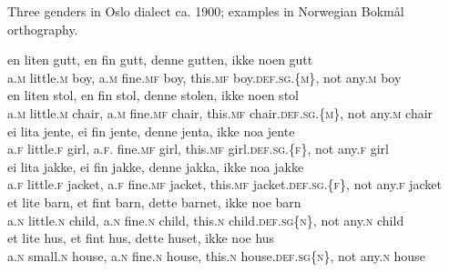 \documentclass[output=paper]{langsci/langscibook}
\begin{document}
\begin{exe}

\ex\label{ex:Enger:1} Three genders in Oslo dialect ca. 1900; examples in Norwegian Bokmål orthography.

\begin{xlist}
\ex\label{ex:Enger:1a}
\gll en liten gutt, en fin gutt, denne gutten, ikke noen gutt \\
a.\textsc{m} little.\textsc{m} boy, a.\textsc{m} fine.\textsc{mf} boy, this.\textsc{mf} boy.\textsc{def}.\textsc{sg}.\textsc{\{m\}}, not any.\textsc{m} boy \\

\ex\label{ex:Enger:1b}
\gll en liten stol, en fin stol, denne stolen, ikke noen stol \\
a.\textsc{m} little.\textsc{m} chair, a.\textsc{m} fine.\textsc{mf} chair, this.\textsc{mf} chair.\textsc{def}.\textsc{sg}.\textsc{\{m\}}, not any.\textsc{m} chair\\

\ex\label{ex:Enger:1c}
\gll ei lita jente, ei fin jente, denne jenta, ikke noa jente \\
a.\textsc{f} little.\textsc{f} girl, a.\textsc{f}. fine.\textsc{mf} girl, this.\textsc{mf} girl.\textsc{def}.\textsc{sg}.\textsc{\{f\}}, not any.\textsc{f} girl\\

\ex\label{ex:Enger:1d}
\gll ei lita jakke, ei fin jakke, denne jakka, ikke noa jakke \\
a.\textsc{f} little.\textsc{f} jacket, a.\textsc{f} fine.\textsc{mf} jacket, this.\textsc{mf} jacket.\textsc{def}.\textsc{sg}.\textsc{\{f\}}, not any.\textsc{f} jacket\\

\ex\label{ex:Enger:1e}
\gll et lite barn, et fint barn, dette barnet, ikke noe barn \\
a.\textsc{n} little.\textsc{n} child, a.\textsc{n} fine.\textsc{n} child, this.\textsc{n} child.\textsc{def}.\textsc{sg\{n\}}, not any.\textsc{n} child\\

\ex\label{ex:Enger:1f}
\gll et lite hus, et fint hus, dette huset, ikke noe hus \\
a.\textsc{n} small.\textsc{n} house, a.\textsc{n} fine.\textsc{n} house, this.\textsc{n} house.\textsc{def}.\textsc{sg\{n\}}, not any.\textsc{n} house\\
\end{xlist}
\end{exe}
\end{document}
